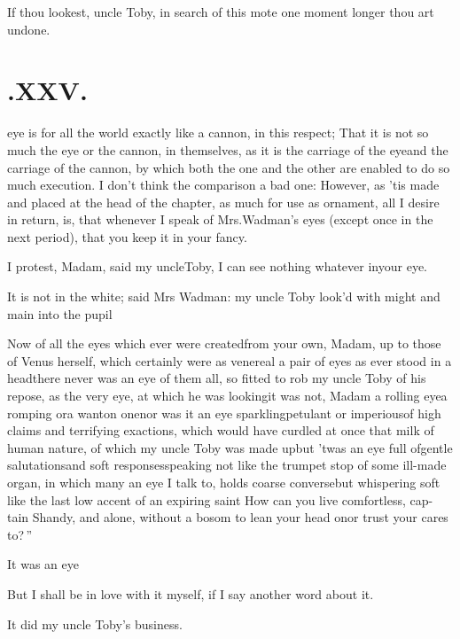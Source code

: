 \documentclass[twoside]{article}
\begin{document}
\tsh If thou lookest, uncle Toby, in\break
search of this mote one moment longer\break
\tsh thou art undone.


\section{.\enspace XXV.}

eye is for all the
world exactly like a cannon, in this
respect;\break
That it is not so much the eye or the cannon, in themselves, as it is the carriage
of the eye\tsh and the carriage of the cannon, by which both the one and the other
are enabled to do so much execution. I don’t think the comparison a bad one:
However, as ’tis made and placed at the head of the chapter, as much for use as
ornament, all I desire in return, is, that whenever I speak of Mrs.\@ Wadman’s eyes
(except once in the next period), that you keep it in your fancy.

I protest, Madam, said my uncle\break Toby, I can see nothing
whatever in\break your eye.

It is not in the white; said Mrs Wadman: my uncle
Toby look’d with might and main into the
pupil\tsh

Now of all the eyes which ever were created\tsh from
your own, Madam, up to those of Venus herself, which
certainly were as venereal a pair of eyes as ever stood in a
head\tsh there never was an eye of them all, so fitted to
rob my uncle Toby of his repose, as the very eye, at which
he was looking\tsh it was not, Madam a rolling
eye\tsh a romping or\break a wanton one\tsk nor was it an eye
spark\-ling\tsk petulant or imperious\tsk of high claims and
terrifying exactions, which would have curdled at once that milk of human
nature, of which my uncle Toby was made up\tsh but
’twas an eye full of\break gentle salutations\tsh and soft
responses\break\tsh speaking \tsh not like the trumpet\break
stop of some ill-made organ, in which many an eye I talk to, holds
coarse converse\tsh but whispering soft \tsh like
the last low accent of an expiring
saint\tsh\break 
\lqq How can you live comfortless, cap-\break
\lqq tain Shandy, and alone, without a\break
\lqq bosom to lean your head on\tsh or\break
\lqq trust your cares to?\,”

It was an eye\tsh

But I shall be in love with it myself,\break
if I say another word about it.

\tsh It did my uncle Toby’s business.
\end{document}
